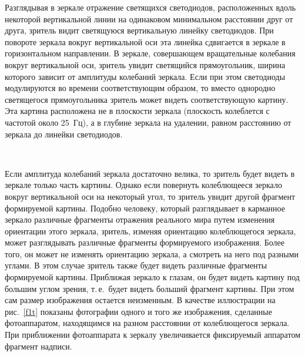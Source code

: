 \begin{multicols}{2}
  Разглядывая в зеркале отражение светящихся светодиодов, расположенных вдоль 
  \columnbreak
некоторой вертикальной линии на одинаковом минимальном расстоянии друг от друга, 
зритель видит светящуюся вертикальную линейку светодиодов. При повороте зеркала 
вокруг вертикальной оси эта линейка сдвигается в зеркале в горизонтальном направлении. 
В зеркале, совершающем вращательные колебания вокруг вертикальной оси, зритель 
увидит светящийся прямоугольник, ширина которого зависит от амплитуды колебаний 
зеркала. Если при этом светодиоды модулируются во времени соответствующим образом, 
то вместо однородно светящегося прямоугольника зритель может видеть 
соответствующую картину. Эта картина расположена не в плоскости зеркала (плоскость 
колеблется с частотой около 25~Гц), а в глубине зеркала на удалении, равном расстоянию 
от зеркала до линейки светодиодов. 

\begin{figure*} %
\vspace*{1pt}
\begin{center}
\mbox{%
\epsfxsize=145.645mm
}
\end{center}
\vspace*{-9pt}
\end{figure*}
  
  Если амплитуда колебаний зеркала достаточно велика, то зритель будет видеть в 
зеркале только часть картины. Однако если повернуть колеблющееся зеркало вокруг 
вертикальной оси на некоторый угол, то зритель увидит другой фрагмент формируемой 
картины. Подобно человеку, который разглядывает в карманное зеркало различные 
фрагменты отражения реального мира путем изменения ориентации этого зеркала, 
зритель, изменяя ориентацию колеблющегося зеркала, может разглядывать различные 
фрагменты формируемого изображения. Более того, он может не изменять ориентацию 
зеркала, а смотреть на него под разными углами. В этом случае зритель также будет 
видеть различные фрагменты формируемой картины. Приближая зеркало к глазам, он 
будет видеть картину под большим углом зрения, т.\,е.\ будет видеть больший фрагмент 
картины. При этом сам размер изображения остается неизменным. В качестве 
иллюстрации на рис.~\ref{f1t} показаны фотографии одного и того же изображения, 
сделанные фотоаппаратом, находящимся на разном расстоянии от колеблющегося 
зеркала. При приближении фотоаппарата к зеркалу увеличивается фиксируемый 
аппаратом фрагмент надписи. 
  

\end{multicols}

